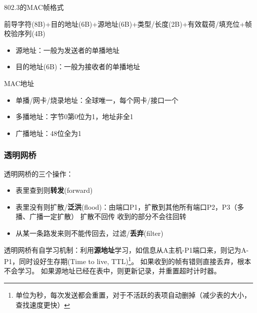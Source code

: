 802.3的MAC帧格式
\begin{center}
前导字符(8B)+目的地址(6B)+源地址(6B)+类型/长度(2B)+有效载荷/填充位+帧校验序列(4B)
\end{center}
\begin{itemize}
\item 源地址：一般为发送者的单播地址
\item 目的地址(6B)：一般为接收者的单播地址
\end{itemize}

MAC地址
\begin{itemize}
	\item 单播/网卡/烧录地址：全球唯一，每个网卡/接口一个
	\item 多播地址：字节0第0位为1，地址非全1
	\item 广播地址：48位全为1
\end{itemize}

\subsubsection{透明网桥}
透明网桥的三个操作：
\begin{itemize}
	\item 表里查到则\textbf{转发}(forward)
	\item 表里没有则扩散/\textbf{泛洪}(flood)：由端口P1，扩散到其他所有端口P2，P3（多播、广播一定扩散）
	扩散不回传
	收到的部分不会往回转
	\item 从某一条路发来则不能传回去，过滤/\textbf{丢弃}(filter)
\end{itemize}

透明网桥有自学习机制：利用\textbf{源地址}学习，如信息从A主机-P1端口来，则记为A-P1，同时设好生存期(Time to live, TTL)\footnote{单位为秒，每次发送都会重置，对于不活跃的表项自动删掉（减少表的大小，查找速度更快）}。
如果收到的帧有错则直接丢弃，根本不会学习。
如果源地址已经在表中，则更新记录，并重置超时计时器。

